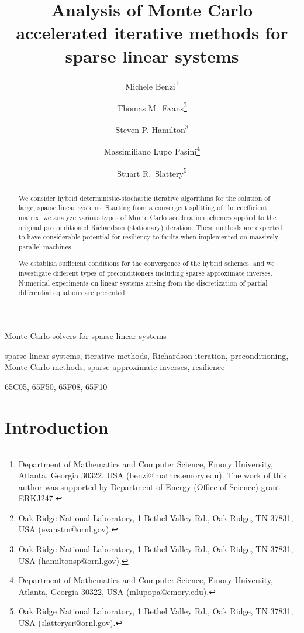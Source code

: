 \documentclass[final,leqno,onefignum,onetabnum]{siamltex1213}
\title{Analysis of Monte Carlo accelerated iterative methods for
sparse linear systems}
\author{Michele Benzi\thanks{Department of Mathematics and Computer
Science, Emory University, Atlanta, Georgia 30322, USA
(benzi@mathcs.emory.edu). The work of this author was supported
by Department of Energy (Office of Science) grant ERKJ247.}
\and
Thomas M.~Evans\thanks{Oak Ridge National Laboratory, 1 Bethel Valley Rd., 
Oak Ridge, TN 37831, USA (evanstm@ornl.gov).}
\and Steven P. Hamilton\thanks{Oak Ridge National Laboratory, 
1 Bethel Valley Rd., Oak Ridge, TN 37831, USA (hamiltonsp@ornl.gov).}
\and 
\linebreak Massimiliano Lupo  Pasini\thanks{Department of Mathematics and Computer
Science, Emory University, Atlanta, Georgia 30322, USA (mlupopa@emory.edu).}
\and 
Stuart R.~Slattery\thanks{Oak Ridge National Laboratory,
1 Bethel Valley Rd., Oak Ridge, TN 37831, USA (slatterysr@ornl.gov).}
}
\date{}
\begin{document}


\pagestyle{myheadings}
{Monte Carlo solvers for sparse linear systems}

\maketitle

\begin{abstract}
We consider hybrid deterministic-stochastic iterative algorithms for the solution
of large, sparse linear systems. Starting from a convergent splitting of the 
coefficient matrix, we analyze various types of Monte Carlo acceleration schemes
applied to the original preconditioned Richardson (stationary) iteration. These
methods are expected to have considerable potential for resiliency to faults
when implemented on massively parallel machines.

We establish sufficient conditions for the convergence of the hybrid schemes, and
we investigate different types of preconditioners including sparse approximate
inverses. Numerical experiments on linear systems arising from the discretization
of partial differential equations are presented.
\end{abstract}

\begin{keywords}
sparse linear systems, iterative methods, Richardson iteration, preconditioning,
Monte Carlo methods, sparse approximate inverses, resilience
\end{keywords}

\begin{AMS}
65C05, 65F50, 65F08, 65F10
\end{AMS}


\section{Introduction}
\label{sec:intro}
\end{document}
